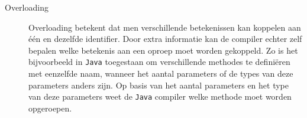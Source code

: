 \begin{description}
 \item [Overloading] Overloading betekent dat men verschillende betekenissen kan koppelen aan \'e\'en en dezelfde identifier. Door extra informatie kan de compiler echter zelf bepalen welke betekenis aan een oproep moet worden gekoppeld. Zo is het bijvoorbeeld in \texttt{Java} toegestaan om verschillende methodes te defini\"eren met eenzelfde naam, wanneer het aantal parameters of de types van deze parameters anders zijn. Op basis van het aantal parameters en het type van deze parameters weet de \texttt{Java} compiler welke methode moet worden opgeroepen.
\end{description}

